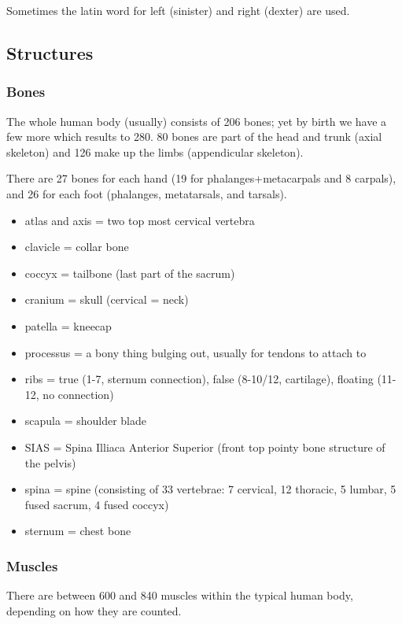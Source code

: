 Sometimes the latin word for left (sinister) and right (dexter) are used.

\subsection{Structures}\label{subsec:structures}

\subsubsection{Bones}

The whole human body (usually) consists of 206 bones; yet by birth we have a few more which results to 280.
80 bones are part of the head and trunk (axial skeleton) and 126 make up the limbs (appendicular skeleton).

There are 27 bones for each hand (19 for phalanges+metacarpals and 8 carpals), and 26 for each foot (phalanges, metatarsals, and tarsals).

\begin{itemize}
    \setlength\itemsep{0em}
    \item atlas and axis = two top most cervical vertebra
    \item clavicle = collar bone
    \item coccyx = tailbone (last part of the sacrum)
    \item cranium = skull (cervical = neck)
    \item patella = kneecap
    \item processus = a bony thing bulging out, usually for tendons to attach to
    \item ribs = true (1-7, sternum connection), false (8-10/12, cartilage), floating (11-12, no connection)
    \item scapula = shoulder blade
    \item SIAS = Spina Illiaca Anterior Superior (front top pointy bone structure of the pelvis)
    \item spina = spine (consisting of 33 vertebrae: 7 cervical, 12 thoracic, 5 lumbar, 5 fused sacrum, 4 fused coccyx)
    \item sternum = chest bone
\end{itemize}

\subsubsection{Muscles}

There are between 600 and 840 muscles within the typical human body, depending on how they are counted.

